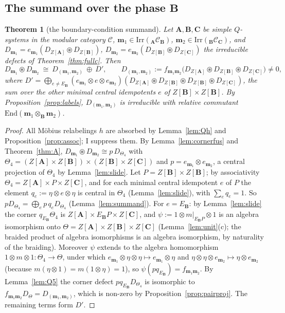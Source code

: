 \documentclass[11pt]{article}
\newtheorem{theorem}{Theorem}[section]
\theoremstyle{definition}
\theoremstyle{remark}
\newcommand{\bfB}{\mathbf B}
\newcommand{\bfA}{\mathbf A}
\newcommand{\bfC}{\mathbf C}
\newcommand{\cfus}{\circledast}
\begin{document}
\subsection{The summand over the phase $\bfB$}
\begin{theorem}[the boundary-condition summand]\label{thm:E2}
Let $\bfA,\bfB,\bfC$ be simple $Q$-systems in the modular category $\mathcal C$, $\mathbf m_1\in\mathrm{Irr}({}_{\bfA}\mathcal C_{\bfB})$, $\mathbf m_2\in\mathrm{Irr}({}_{\bfB}\mathcal C_{\bfC})$, and $D_{\mathbf m_1}=e_{\mathbf m_1}(D_{Z[\bfA]}\cfus D_{Z[\bfB]})$, $D_{\mathbf m_2}=e_{\mathbf m_2}(D_{Z[\bfB]}\cfus D_{Z[\bfC]})$ the irreducible defects of Theorem~\ref{thm:fullc}. Then
\[
D_{\mathbf m_1}\cfus D_{\mathbf m_2}\ \cong\ D_{(\mathbf m_1,\mathbf m_2)}\ \oplus\ D',\qquad D_{(\mathbf m_1,\mathbf m_2)}:=f_{\mathbf m_1\mathbf m_2}\big(D_{Z[\bfA]}\cfus D_{Z[\bfB]}\cfus D_{Z[\bfC]}\big)\neq0,
\]
where $D'=\bigoplus_{e\neq E_{\bfB}}(e_{\mathbf m_1}\otimes e\otimes e_{\mathbf m_2})(D_{Z[\bfA]}\cfus D_{Z[\bfB]}\cfus D_{Z[\bfB]}\cfus D_{Z[\bfC]})$, the sum over the other minimal central idempotents $e$ of $Z[\bfB]\times Z[\bfB]$. By Proposition~\ref{prop:labels}, $D_{(\mathbf m_1,\mathbf m_2)}$ is irreducible with relative commutant $\mathrm{End}(\mathbf m_1\otimes_{\bfB}\mathbf m_2)$.
\end{theorem}
\begin{proof}
All Möbius relabelings $h$ are absorbed by Lemma~\ref{lem:Qh} and Proposition~\ref{prop:assoc}; I suppress them. By Lemma~\ref{lem:cornerfus} and Theorem~\ref{thm:A}, $D_{\mathbf m_1}\cfus D_{\mathbf m_2}\cong p\,D_{\Theta_4}$ with $\Theta_4=(Z[\bfA]\times Z[\bfB])\times(Z[\bfB]\times Z[\bfC])$ and $p=e_{\mathbf m_1}\otimes e_{\mathbf m_2}$, a central projection of $\Theta_4$ by Lemma~\ref{lem:slide}. Let $P=Z[\bfB]\times Z[\bfB]$; by associativity $\Theta_4=Z[\bfA]\times P\times Z[\bfC]$, and for each minimal central idempotent $e$ of $P$ the element $q_e:=\eta\otimes e\otimes\eta$ is central in $\Theta_4$ (Lemma~\ref{lem:slide}), with $\sum_eq_e=1$. So $pD_{\Theta_4}=\bigoplus_ep\,q_eD_{\Theta_4}$ (Lemma~\ref{lem:summand}). For $e=E_{\bfB}$: by Lemma~\ref{lem:slide} the corner $q_{E_{\bfB}}\Theta_4$ is $Z[\bfA]\times E_{\bfB}P\times Z[\bfC]$, and $\psi:=1\otimes m|_{E_{\bfB}P}\otimes1$ is an algebra isomorphism onto $\Theta=Z[\bfA]\times Z[\bfB]\times Z[\bfC]$ (Lemma~\ref{lem:unit}(c); the braided product of algebra isomorphisms is an algebra isomorphism, by naturality of the braiding). Moreover $\psi$ extends to the algebra homomorphism $1\otimes m\otimes1\colon\Theta_4\to\Theta$, under which $e_{\mathbf m_1}\otimes\eta\otimes\eta\mapsto e_{\mathbf m_1}\otimes\eta$ and $\eta\otimes\eta\otimes e_{\mathbf m_2}\mapsto\eta\otimes e_{\mathbf m_2}$ (because $m(\eta\otimes1)=m(1\otimes\eta)=1$), so $\psi(pq_{E_{\bfB}})=f_{\mathbf m_1\mathbf m_2}$. By Lemma~\ref{lem:Q5} the corner defect $pq_{E_{\bfB}}D_{\Theta_4}$ is isomorphic to $f_{\mathbf m_1\mathbf m_2}D_\Theta=D_{(\mathbf m_1,\mathbf m_2)}$, which is non-zero by Proposition~\ref{prop:pairproj}. The remaining terms form $D'$.
\end{proof}
\end{document}
